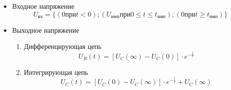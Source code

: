 \begin{itemize}

\item Входное напряжение\\
\begin{equation}
U_\text{вх} = \{(0 \text{при} t < 0); (U_\text{имп} \text{при} 0 \leq t \leq t_\text{имп}); (0 \text{при} t \geq t_\text{имп})\}
\end{equation}

\item Выходное напряжение\\
\begin{enumerate}
\item Дифференцирующая цепь\\
\begin{equation}
U_R(t) = [U_C(\infty) - U_C(0)] \cdot e^{-\frac{t}{\tau}}
\end{equation}

\item Интегрирующая цепь\\
\begin{equation}
U_C(t) = [U_C(0) - U_C(\infty)] \cdot e^{-\frac{t}{\tau}} + U_C(\infty)
\end{equation}

\end{enumerate}
\end{itemize}


